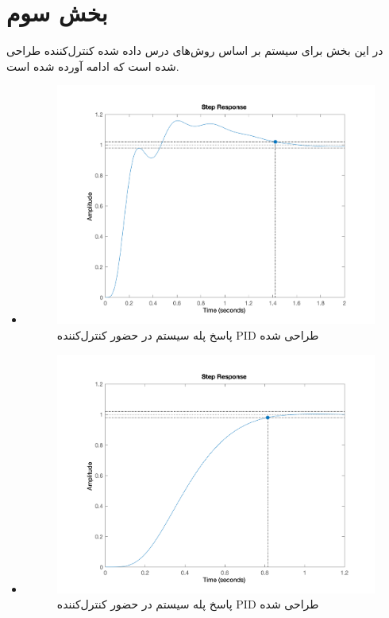 \chapter{بخش سوم}
 در این بخش برای سیستم بر اساس روش‌های درس داده شده کنترل‌کننده طراحی شده است که ادامه آورده شده است.
 \newpage
\begin{itemize}
	\item {}
	\begin{figure}[H]
		\centering
		\includegraphics[width=12cm]{../Figure/P_III/zn.png}
		\caption{پاسخ پله سیستم در حضور کنترل‌کننده PID طراحی شده }
	\end{figure}
	\item {}
	\begin{figure}[H]
		\centering
		\includegraphics[width=12cm]{../Figure/P_III/rzn.png}
		\caption{پاسخ پله سیستم در حضور کنترل‌کننده PID طراحی شده }

\end{figure}
\end{itemize}
